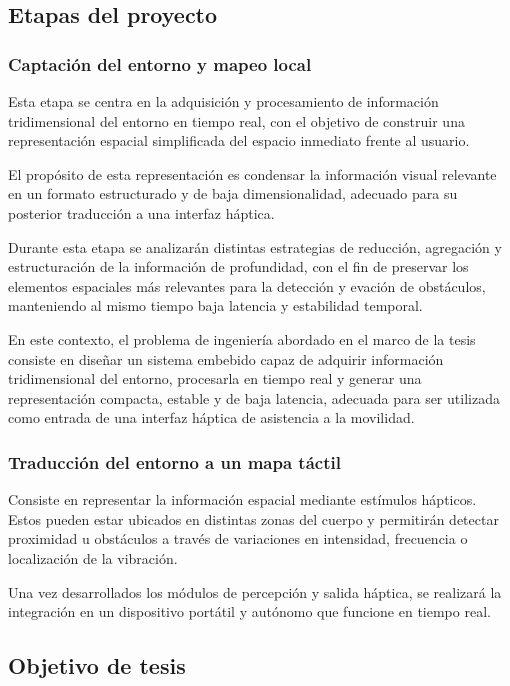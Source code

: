 \subsection{Etapas del proyecto}

\subsubsection{Captación del entorno y mapeo local}

Esta etapa se centra en la adquisición y procesamiento de información tridimensional del entorno en tiempo real,
con el objetivo de construir una representación espacial simplificada del espacio inmediato frente al usuario.

El propósito de esta representación es condensar la información visual relevante en un formato
estructurado y de baja dimensionalidad, adecuado para su posterior traducción a una interfaz háptica.

Durante esta etapa se analizarán distintas estrategias de reducción, agregación y estructuración de la
información de profundidad, con el fin de preservar los elementos espaciales más relevantes para la
detección y evación de obstáculos, manteniendo al mismo tiempo baja latencia y estabilidad temporal.

En este contexto, el problema de ingeniería abordado en el marco de la tesis consiste en diseñar un
sistema embebido capaz de adquirir información tridimensional del entorno, procesarla en tiempo real
y generar una representación compacta, estable y de baja latencia, adecuada para ser utilizada como
entrada de una interfaz háptica de asistencia a la movilidad.

\subsubsection{Traducción del entorno a un mapa táctil}

Consiste en representar la información espacial mediante estímulos hápticos.
Estos pueden estar ubicados en distintas zonas del cuerpo y permitirán detectar proximidad u obstáculos a través de variaciones en intensidad,
frecuencia o localización de la vibración.

Una vez desarrollados los módulos de percepción y salida háptica, se realizará la integración en un dispositivo portátil y autónomo que funcione
en tiempo real.

\subsection{Objetivo de tesis}

